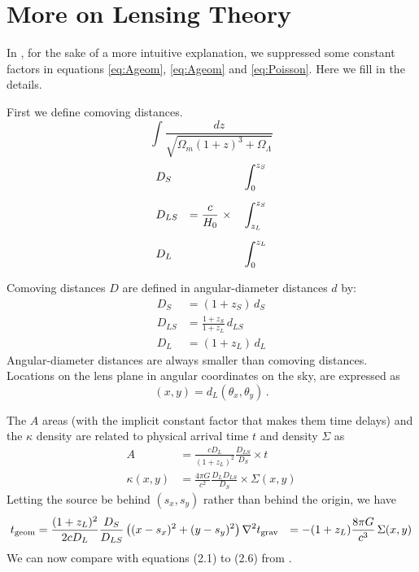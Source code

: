 \appendix

\section{More on Lensing Theory} \label{sec:more-theory}

In , for the sake of a more intuitive
explanation, we suppressed some constant factors in
equations \eqref{eq:Ageom}, \eqref{eq:Ageom} and \eqref{eq:Poisson}.
Here we fill in the details.

First we define comoving distances.
\begin{equation}
\int \frac{dz}{\sqrt{\Omega_m(1+z)^3 + \Omega_\Lambda}}
\end{equation}
\begin{equation}
\begin{aligned}
&D_S    &                                &\int_0^{z_S} \\
\noalign{\medskip}
&D_{LS} & = \frac c{H_0} \ \times \quad  &\int_{z_L}^{z_S} \\
\noalign{\medskip}
&D_L    &                                &\int_0^{z_L}
\end{aligned}
\end{equation}

Comoving distances $D$ are defined in angular-diameter distances
$d$ by:
\begin{equation}
\begin{aligned}
D_S &= (1+z_S) \, d_S \\
D_{LS} &= \frac{1+z_S}{1+z_L} \, d_{LS} \\
D_L &= (1+z_L) \, d_L
\end{aligned}
\end{equation}
Angular-diameter distances are always smaller than comoving distances.
Locations on the lens plane in angular coordinates on the
sky, are expressed as
\begin{equation}
(x,y) = d_L (\theta_x,\theta_y) \,.
\end{equation}

The $A$ areas (with the implicit
constant factor that makes them time delays) and the $\kappa$ density are related to physical arrival
time $t$ and density $\Sigma$ as
\begin{equation}
\begin{aligned}
A           &= \frac{cD_L}{(1+z_L)^2} \frac{D_{LS}}{D_S} \times t \\
\kappa(x,y) &= \frac{4\pi G}{c^2} \frac{{D_L}{D_{LS}}}{D_S}
               \times \Sigma(x,y)
\end{aligned}
\end{equation}
Letting the source be behind $(s_x,s_y)$ rather than behind the
origin, we have
\begin{equation}
\begin{aligned}
t_{\rm geom} &= \frac{(1+z_L)^2}{2cD_L} \frac{D_S}{D_{LS}}
\left( (x-s_x)^2 + (y-s_y)^2 \right)
\nabla^2 t_{\rm grav} &= -(1+z_L)\frac{8\pi G}{c^3} \, \Sigma(x,y)
\end{aligned}
\end{equation}
We can now compare with equations (2.1) to (2.6)
from \cite{1986ApJ...310..568B}.

